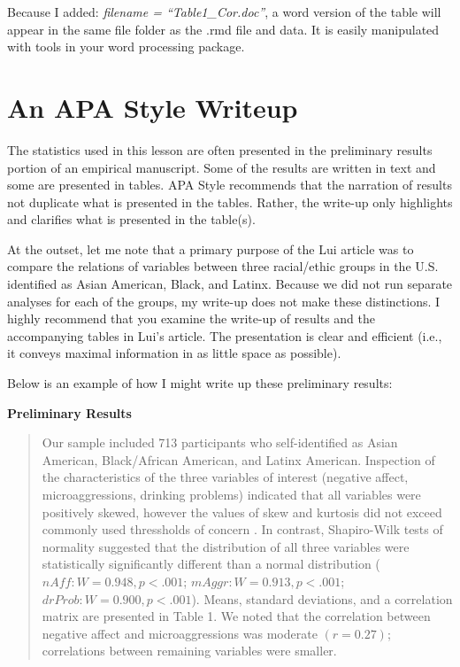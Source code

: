 \documentclass[
  11pt,
]{book}
\begin{document}
Because I added: \emph{filename = ``Table1\_Cor.doc''}, a word version of the table will appear in the same file folder as the .rmd file and data. It is easily manipulated with tools in your word processing package.

\hypertarget{an-apa-style-writeup}{%
\section{An APA Style Writeup}\label{an-apa-style-writeup}}

The statistics used in this lesson are often presented in the preliminary results portion of an empirical manuscript. Some of the results are written in text and some are presented in tables. APA Style recommends that the narration of results not duplicate what is presented in the tables. Rather, the write-up only highlights and clarifies what is presented in the table(s).

At the outset, let me note that a primary purpose of the Lui \citeyearpar{lui_racial_2020} article was to compare the relations of variables between three racial/ethic groups in the U.S. identified as Asian American, Black, and Latinx. Because we did not run separate analyses for each of the groups, my write-up does not make these distinctions. I highly recommend that you examine the write-up of results and the accompanying tables in Lui's article. The presentation is clear and efficient (i.e., it conveys maximal information in as little space as possible).

Below is an example of how I might write up these preliminary results:

\textbf{Preliminary Results}

\begin{quote}
Our sample included 713 participants who self-identified as Asian American, Black/African American, and Latinx American. Inspection of the characteristics of the three variables of interest (negative affect, microaggressions, drinking problems) indicated that all variables were positively skewed, however the values of skew and kurtosis did not exceed commonly used thressholds of concern \citep{kline_data_2016}. In contrast, Shapiro-Wilk tests of normality suggested that the distribution of all three variables were statistically significantly different than a normal distribution (\(nAff: W = 0.948, p < .001\); \(mAggr: W = 0.913, p < .001\); \(drProb: W = 0.900, p < .001\)). Means, standard deviations, and a correlation matrix are presented in Table 1. We noted that the correlation between negative affect and microaggressions was moderate \((r = 0.27)\); correlations between remaining variables were smaller.
\end{quote}
\end{document}
